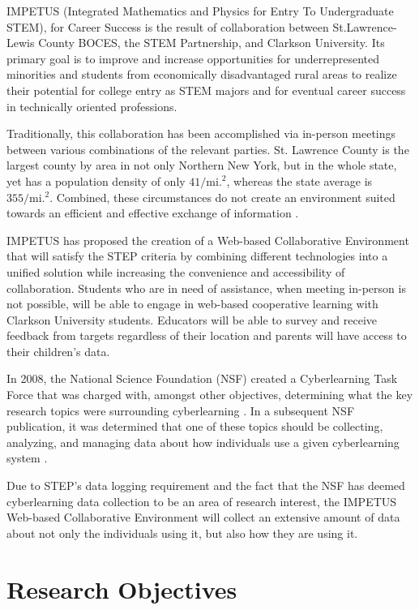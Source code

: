 IMPETUS (Integrated Mathematics and Physics for Entry To Undergraduate STEM), for Career Success is the result of collaboration between St.Lawrence-Lewis County BOCES, the STEM Partnership, and Clarkson University. Its primary goal is to improve and increase opportunities for underrepresented minorities and students from economically disadvantaged rural areas to realize their potential for college entry as STEM majors and for eventual career success in technically oriented professions.

Traditionally, this collaboration has been accomplished via in-person meetings between various combinations of the relevant parties. St. Lawrence County is the largest county by area in not only Northern New York, but in the whole state, yet has a population density of only $41/\mathrm{mi.}^2$, whereas the state average is $355/\mathrm{mi.}^2$. Combined, these circumstances do not create an environment suited towards an efficient and effective exchange of information \cite{nny-prism}.

IMPETUS has proposed the creation of a Web-based Collaborative Environment that will satisfy the STEP criteria by combining different technologies into a unified solution while increasing the convenience and accessibility of collaboration. Students who are in need of assistance, when meeting in-person is not possible, will be able to engage in web-based cooperative learning with Clarkson University students. Educators will be able to survey and receive feedback from targets regardless of their location and parents will have access to their children's data.

In 2008, the National Science Foundation (NSF) created a Cyberlearning Task Force that was charged with, amongst other objectives, determining what the key research topics were surrounding cyberlearning \cite{nsf-taskforce}. In a subsequent NSF publication, it was determined that one of these topics should be collecting, analyzing, and managing data about how individuals use a given cyberlearning system \cite{nsf-cyberlearning}.

Due to STEP's data logging requirement and the fact that the NSF has deemed cyberlearning data collection to be an area of research interest, the IMPETUS Web-based Collaborative Environment will collect an extensive amount of data about not only the individuals using it, but also how they are using it.

\section{Research Objectives}

